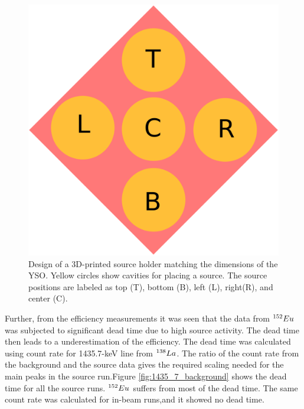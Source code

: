 \begin{figure}[h]
	\centering
	\includegraphics[scale=0.5]{figures/Yso_source_holder.png}
	\caption[]{Design of a 3D-printed source holder matching the dimensions of the YSO. Yellow circles show cavities for placing a source. The source positions are labeled as top (T), bottom (B), left (L), right(R), and center (C). }
	\label{fig:YSO_source_holder}
\end{figure}


Further, from the efficiency measurements it was seen that the data from $\textsuperscript{152}Eu$ was subjected to significant dead time due to high source activity. The dead time then leads to a underestimation of the efficiency. The dead time was calculated using count rate for 1435.7-keV line from $\textsuperscript{138}La$. The ratio of the count rate from the background and the source data gives the required scaling needed for the main peaks in the source run.Figure \ref{fig:1435_7_background} shows the dead time for all the source runs. $\textsuperscript{152}Eu$ suffers from most of the dead time. The same count rate was calculated for in-beam runs,and it showed no dead time.

